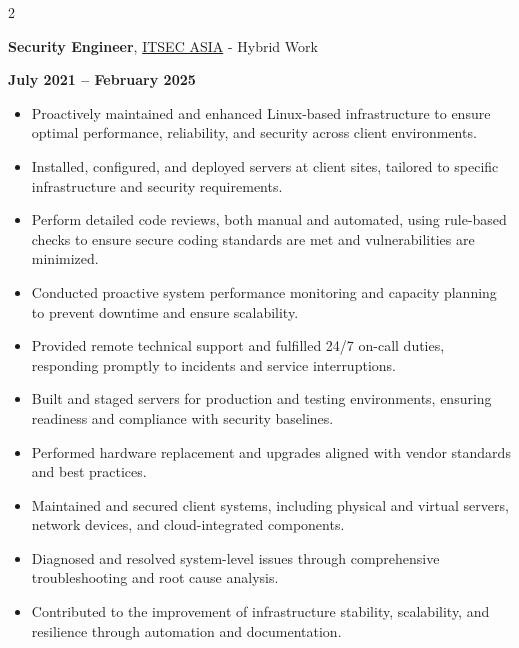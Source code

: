 \documentclass[10pt, letterpaper]{article}
\newenvironment{highlights}{
    \begin{itemize}[
        topsep=0.10 cm,
        parsep=0.10 cm,
        partopsep=0pt,
        itemsep=0pt,
        leftmargin=0 cm + 10pt
    ]
}{
    \end{itemize}
} %
\newenvironment{twocolentry}[2][]{
    \onecolentry
    \def\secondColumn{#2}
    \setcolumnwidth{\fill, 4.5 cm}
    \begin{paracol}{2}
}{
    \switchcolumn \raggedleft \secondColumn
    \end{paracol}
    \endonecolentry
} %
\let\hrefWithoutArrow\href
\begin{document}
		\begin{twocolentry}{\textbf{July 2021 – February 2025}}
			\textbf{Security Engineer}, \hrefWithoutArrow{https://www.itsec.asia/}{ITSEC ASIA} - Hybrid Work
		\end{twocolentry}
		
		\vspace{0.10 cm}
		\begin{justify}
			
			\begin{highlights}
			\item Proactively maintained and enhanced Linux-based infrastructure to ensure optimal performance, reliability, and security across client environments.
			
			\item Installed, configured, and deployed servers at client sites, tailored to specific infrastructure and security requirements.
			
			\item Perform detailed code reviews, both manual and automated, using rule-based checks to ensure secure coding standards are met and vulnerabilities are minimized.
			
			\item Conducted proactive system performance monitoring and capacity planning to prevent downtime and ensure scalability.
			
			\item Provided remote technical support and fulfilled 24/7 on-call duties, responding promptly to incidents and service interruptions.
			
			\item Built and staged servers for production and testing environments, ensuring readiness and compliance with security baselines.
			
			\item Performed hardware replacement and upgrades aligned with vendor standards and best practices.

            \item Maintained and secured client systems, including physical and virtual servers, network devices, and cloud-integrated components.

            \item Diagnosed and resolved system-level issues through comprehensive troubleshooting and root cause analysis.

            \item Contributed to the improvement of infrastructure stability, scalability, and resilience through automation and documentation.


\end{highlights}
\end{justify}
\end{document}
